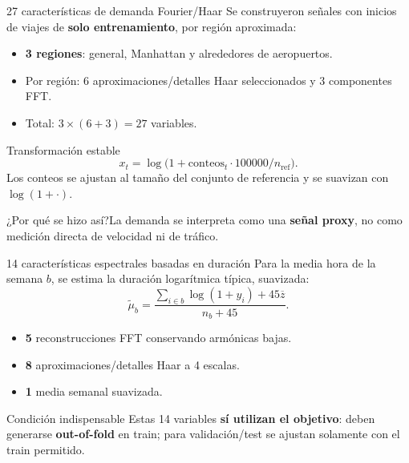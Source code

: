 \documentclass[aspectratio=169,11pt]{beamer}
\newcommand{\porq}[1]{\vspace{1.2mm}\begin{block}{¿Por qué se hizo así?}\small #1\end{block}}
\begin{document}
\begin{frame}{27 características de demanda Fourier/Haar}
\small
Se construyeron señales con inicios de viajes de \textbf{solo entrenamiento}, por región aproximada:
\begin{itemize}
\item \textbf{3 regiones}: general, Manhattan y alrededores de aeropuertos.
\item Por región: 6 aproximaciones/detalles Haar seleccionados y 3 componentes FFT.
\item Total: \(3\times(6+3)=\boxed{27}\) variables.
\end{itemize}
\begin{block}{Transformación estable}
\[
 x_t=\log\!\big(1+\mathrm{conteos}_t\cdot100000/n_{\mathrm{ref}}\big).
\]
\small Los conteos se ajustan al tamaño del conjunto de referencia y se suavizan con \(\log(1+\cdot)\).
\end{block}
\porq{La demanda se interpreta como una \textbf{señal proxy}, no como medición directa de velocidad ni de tráfico.}
\end{frame}

\begin{frame}{14 características espectrales basadas en duración}
\small
Para la media hora de la semana \(b\), se estima la duración logarítmica típica, suavizada:
\[
\widetilde\mu_b=\frac{\sum_{i\in b} \log(1+y_i)+45\overline z}{n_b+45}.
\]
\begin{itemize}
\item \textbf{5} reconstrucciones FFT conservando armónicas bajas.
\item \textbf{8} aproximaciones/detalles Haar a 4 escalas.
\item \textbf{1} media semanal suavizada.
\end{itemize}
\begin{block}{Condición indispensable}
\textcolor{Warning}{Estas 14 variables \textbf{sí utilizan el objetivo}}: deben generarse \textbf{out-of-fold} en train; para validación/test se ajustan solamente con el train permitido.
\end{block}
\end{frame}
\end{document}
